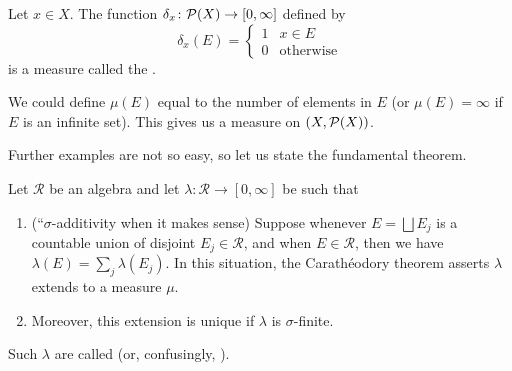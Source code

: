 \begin{example}
Let $x\in X$. The function $\delta_{x}\colon\mathcal{P}(X)\to[0,\infty]$
defined by
\begin{equation}
\delta_{x}(E)=\begin{cases}1 & x\in E\\
0 & \mbox{otherwise}
\end{cases}
\end{equation}
is a measure called the .
\end{example}

\begin{example}
We could define $\mu(E)$ equal to the number of elements in $E$ (or
$\mu(E)=\infty$ if $E$ is an infinite set). This gives us a measure on
$(X,\mathcal{P}(X))$. 
\end{example}

\begin{node}
Further examples are not so easy, so let us state the fundamental theorem.
\end{node}

\begin{theorem}
Let $\mathcal{R}$ be an algebra and let
$\lambda\colon\mathcal{R}\to[0,\infty]$ be such that
\begin{enumerate}
\item (``$\sigma$-additivity
  when it makes sense) Suppose whenever $E=\bigsqcup E_{j}$ is a countable union of disjoint
  $E_{j}\in\mathcal{R}$, and when $E\in\mathcal{R}$, then we have
  $\lambda(E)=\sum_{j}\lambda(E_{j})$. In this situation, the
  Carath\'{e}odory theorem asserts $\lambda$ extends to a measure $\mu$.
\item Moreover, this extension is unique if $\lambda$ is $\sigma$-finite.
\end{enumerate}
Such $\lambda$ are called  (or, confusingly,
).
\end{theorem}
